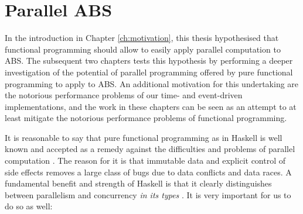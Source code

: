\chapter{Parallel ABS}
\label{ch:parallel_abs}
In the introduction in Chapter \ref{ch:motivation}, this thesis hypothesised that functional programming should allow to easily apply parallel computation to ABS. The subsequent two chapters tests this hypothesis by performing a deeper investigation of the potential of parallel programming offered by pure functional programming to apply to ABS. An additional motivation for this undertaking are the notorious performance problems of our time- and event-driven implementations, and the work in these chapters can be seen as an attempt to at least mitigate the notorious performance problems of functional programming.

\medskip

It is reasonable to say that pure functional programming as in Haskell is well known and accepted as a remedy against the difficulties and problems of parallel computation \cite{hudak_history_2007}. The reason for it is that immutable data and explicit control of side effects removes a large class of bugs due to data conflicts and data races. A fundamental benefit and strength of Haskell is that it clearly distinguishes between parallelism and concurrency \textit{in its types} \cite{jones_tackling_2002}. It is very important for us to do so as well:

